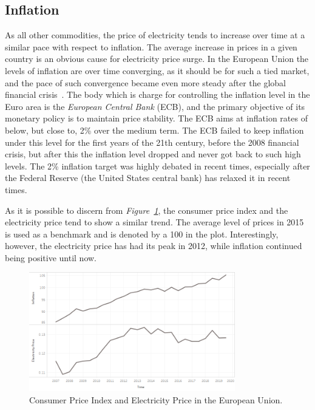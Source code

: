 \documentclass[a4paper,12pt]{book}
\begin{document}
\subsection{Inflation}

As all other commodities, the price of electricity tends to increase over time at a similar pace with respect to inflation. The average increase in prices in a given country is an obvious cause for electricity price surge. In the European Union the levels of inflation are over time converging, as it should be for such a tied market, and the pace of such convergence became even more steady after the global financial crisis~\cite{brovz2018dynamics}. The body which is charge for controlling the inflation level in the Euro area is the \textit{European Central Bank} (ECB), and the primary objective of its monetary policy is to maintain price stability. The ECB aims at inflation rates of below, but close to, 2\% over the medium term. The ECB failed to keep inflation under this level for the first years of the 21th century, before the 2008 financial crisis, but after this the inflation level dropped and never got back to such high levels. The 2\% inflation target was highly debated in recent times, especially after the Federal Reserve (the United States central bank) has relaxed it in recent times.

As it is possible to discern from \textit{Figure~\ref{fig:infl}}, the consumer price index and the electricity price tend to show a similar trend. The average level of prices in 2015 is used as a benchmark and is denoted by a 100 in the plot. Interestingly, however, the electricity price has had its peak in 2012, while inflation continued being positive until now.

\begin{figure}[tb]
\begin{center}
\captionsetup{justification=centering}
\includegraphics[width=0.8\textwidth]{Images/inf.png}
\caption{Consumer Price Index and Electricity Price in the European Union.}
\label{fig:infl}
\end{center}
\end{figure}
\end{document}
